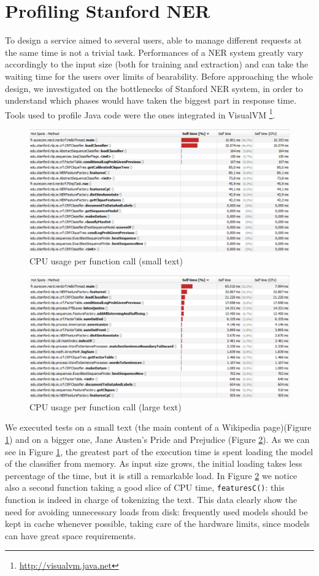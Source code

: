 \documentclass[a4paper,11pt]{report}
\begin{document}
\section{Profiling Stanford NER}
\label{sec:profNER}
To design a service aimed to several users, able to manage different requests at the same time is not a trivial task. Performances of a NER system greatly vary accordingly to the input size (both for training and extraction) and can take the waiting time for the users over limits of bearability. Before approaching the whole design, we investigated on the bottlenecks of Stanford NER system, in order to understand which phases would have taken the biggest part in response time.
Tools used to profile Java code were the ones integrated in VisualVM \footnote{\url{http://visualvm.java.net}}.
\begin{figure}[htbp] 
\centering
\includegraphics[width=\textwidth]{functions}
\caption{CPU usage per function call (small text)}
\label{fig:profile1}
\end{figure}
\begin{figure}[htbp] 
\centering
\includegraphics[width=\textwidth]{functions2}
\caption{CPU usage per function call (large text)}
\label{fig:profile2}
\end{figure}
We executed tests on a small text (the main content of a Wikipedia page)(Figure \ref{fig:profile1}) and on a bigger one, Jane Austen's Pride and Prejudice (Figure \ref{fig:profile2}).
As we can see in Figure \ref{fig:profile1}, the greatest part of the execution time is spent loading the model of the classifier from memory. As input size grows, the initial loading takes less percentage of the time, but it is still a remarkable load. In Figure \ref{fig:profile2} we notice also a second function taking a good slice of CPU time, \texttt{featuresC()}: this function is indeed in charge of tokenizing the text.
This data clearly show the need for avoiding unnecessary loads from disk: frequently used models should be kept in cache whenever possible, taking care of the hardware limits, since models can have great space requirements.
\end{document}
